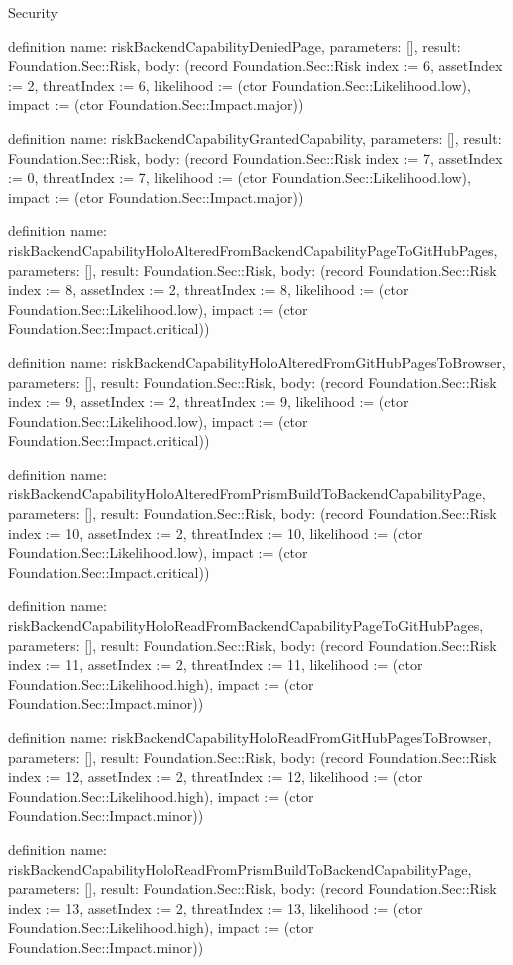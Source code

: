 \begin{lexlean}{Security}
\begin{semanticmodule}
definition{
  name: riskBackendCapabilityDeniedPage,
  parameters: [],
  result: Foundation.Sec::Risk,
  body: (record Foundation.Sec::Risk {index := 6, assetIndex := 2, threatIndex := 6, likelihood := (ctor Foundation.Sec::Likelihood.low), impact := (ctor Foundation.Sec::Impact.major)})
}

definition{
  name: riskBackendCapabilityGrantedCapability,
  parameters: [],
  result: Foundation.Sec::Risk,
  body: (record Foundation.Sec::Risk {index := 7, assetIndex := 0, threatIndex := 7, likelihood := (ctor Foundation.Sec::Likelihood.low), impact := (ctor Foundation.Sec::Impact.major)})
}

definition{
  name: riskBackendCapabilityHoloAlteredFromBackendCapabilityPageToGitHubPages,
  parameters: [],
  result: Foundation.Sec::Risk,
  body: (record Foundation.Sec::Risk {index := 8, assetIndex := 2, threatIndex := 8, likelihood := (ctor Foundation.Sec::Likelihood.low), impact := (ctor Foundation.Sec::Impact.critical)})
}

definition{
  name: riskBackendCapabilityHoloAlteredFromGitHubPagesToBrowser,
  parameters: [],
  result: Foundation.Sec::Risk,
  body: (record Foundation.Sec::Risk {index := 9, assetIndex := 2, threatIndex := 9, likelihood := (ctor Foundation.Sec::Likelihood.low), impact := (ctor Foundation.Sec::Impact.critical)})
}

definition{
  name: riskBackendCapabilityHoloAlteredFromPrismBuildToBackendCapabilityPage,
  parameters: [],
  result: Foundation.Sec::Risk,
  body: (record Foundation.Sec::Risk {index := 10, assetIndex := 2, threatIndex := 10, likelihood := (ctor Foundation.Sec::Likelihood.low), impact := (ctor Foundation.Sec::Impact.critical)})
}

definition{
  name: riskBackendCapabilityHoloReadFromBackendCapabilityPageToGitHubPages,
  parameters: [],
  result: Foundation.Sec::Risk,
  body: (record Foundation.Sec::Risk {index := 11, assetIndex := 2, threatIndex := 11, likelihood := (ctor Foundation.Sec::Likelihood.high), impact := (ctor Foundation.Sec::Impact.minor)})
}

definition{
  name: riskBackendCapabilityHoloReadFromGitHubPagesToBrowser,
  parameters: [],
  result: Foundation.Sec::Risk,
  body: (record Foundation.Sec::Risk {index := 12, assetIndex := 2, threatIndex := 12, likelihood := (ctor Foundation.Sec::Likelihood.high), impact := (ctor Foundation.Sec::Impact.minor)})
}

definition{
  name: riskBackendCapabilityHoloReadFromPrismBuildToBackendCapabilityPage,
  parameters: [],
  result: Foundation.Sec::Risk,
  body: (record Foundation.Sec::Risk {index := 13, assetIndex := 2, threatIndex := 13, likelihood := (ctor Foundation.Sec::Likelihood.high), impact := (ctor Foundation.Sec::Impact.minor)})
}


\end{semanticmodule}
\end{lexlean}
